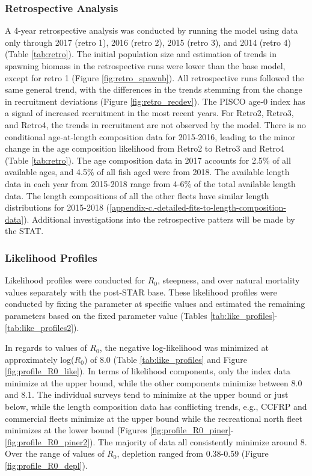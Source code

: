 \documentclass[12pt,]{article}
\begin{document}
\subsubsection{Retrospective Analysis}\label{retrospective-analysis}

A 4-year retrospective analysis was conducted by running the model using
data only through 2017 (retro 1), 2016 (retro 2), 2015 (retro 3), and
2014 (retro 4) (Table \ref{tab:retro}). The initial population size and
estimation of trends in spawning biomass in the retrospective runs were
lower than the base model, except for retro 1 (Figure
\ref{fig:retro_spawnb}). All retrospective runs followed the same
general trend, with the differences in the trends stemming from the
change in recruitment deviations (Figure \ref{fig:retro_recdev}). The
PISCO age-0 index has a signal of increased recruitment in the most
recent years. For Retro2, Retro3, and Retro4, the trends in recruitment
are not observed by the model. There is no conditional age-at-length
composition data for 2015-2016, leading to the minor change in the age
composition likelihood from Retro2 to Retro3 and Retro4 (Table
\ref{tab:retro}). The age composition data in 2017 accounts for 2.5\% of
all available ages, and 4.5\% of all fish aged were from 2018. The
available length data in each year from 2015-2018 range from 4-6\% of
the total available length data. The length compositions of all the
other fleets have similar length distributions for 2015-2018
(\ref{appendix-c.-detailed-fits-to-length-composition-data}). Additional
investigations into the retrospective patters will be made by the STAT.

\subsubsection{Likelihood Profiles}\label{likelihood-profiles}

Likelihood profiles were conducted for \(R_0\), steepness, and over
natural mortality values separately with the post-STAR base. These
likelihood profiles were conducted by fixing the parameter at specific
values and estimated the remaining parameters based on the fixed
parameter value (Tables
\ref{tab:like_profiles}-\ref{tab:like_profiles2}).

In regards to values of \(R_0\), the negative log-likelihood was
minimized at approximately log(\(R_0\)) of 8.0 (Table
\ref{tab:like_profiles} and Figure \ref{fig:profile_R0_like}). In terms
of likelihood components, only the index data minimize at the upper
bound, while the other components minimize between 8.0 and 8.1. The
individual surveys tend to minimize at the upper bound or just below,
while the length composition data has conflicting trends, e.g., CCFRP
and commercial fleets minimize at the upper bound while the recreational
north fleet minimizes at the lower bound (Figures
\ref{fig:profile_R0_piner}-\ref{fig:profile_R0_piner2}). The majority of
data all consistently minimize around 8. Over the range of values of
\(R_0\), depletion ranged from 0.38-0.59 (Figure
\ref{fig:profile_R0_depl}).
\end{document}
